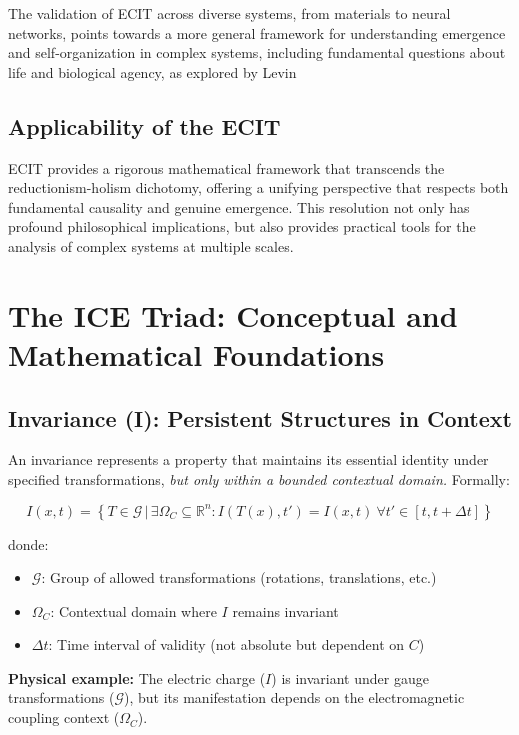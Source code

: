 \documentclass{article}
\begin{document}
\bigskip
\noindent The validation of ECIT across diverse systems, from materials to neural networks, points towards a more general framework for understanding emergence and self-organization in complex systems, including fundamental questions about life and biological agency, as explored by Levin \cite{Levin2021}

\subsection{Applicability of the ECIT}
ECIT provides a rigorous mathematical framework that transcends the reductionism-holism dichotomy, offering a unifying perspective that respects both fundamental causality and genuine emergence. This resolution not only has profound philosophical implications, but also provides practical tools for the analysis of complex systems at multiple scales.

\section{The ICE Triad: Conceptual and Mathematical Foundations}
\label{sec:triada_ICE}

\subsection{Invariance (I): Persistent Structures in Context}
An invariance represents a property that maintains its essential identity under specified transformations, \textit{but only within a bounded contextual domain. }
Formally:

\begin{equation}\label{eq:invariancia}
I(x,t) = \left\{ T \in \mathcal{G} \,|\, \exists \Omega_C \subseteq \mathbb{R}^n: I(T(x), t') = I(x,t) \ \forall t' \in [t, t + \Delta t] \right\}
\end{equation}

donde:
\begin{itemize}
\item $\mathcal{G}$: Group of allowed transformations (rotations, translations, etc.)
\item $\Omega_C$: Contextual domain where $I$ remains invariant
\item $\Delta t$: Time interval of validity (not absolute but dependent on $C$)
\end{itemize}

\textbf{Physical example:} The electric charge ($I$) is invariant under gauge transformations ($\mathcal{G}$), but its manifestation depends on the electromagnetic coupling context ($\Omega_C$).
\end{document}
